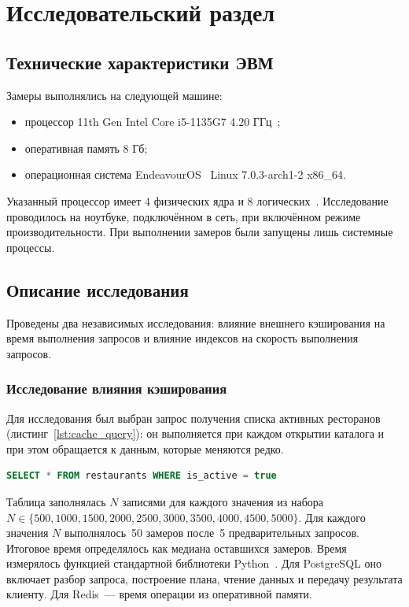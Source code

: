 \section{Исследовательский раздел}

\subsection{Технические характеристики ЭВМ}
Замеры выполнялись на следующей машине:
\begin{itemize}
    \item процессор 11th Gen Intel Core i5-1135G7 4.20 ГГц~\cite{processor};
    \item оперативная память 8 Гб;
    \item операционная система EndeavourOS~\cite{endeavouros} Linux 7.0.3-arch1-2 x86\_64.
\end{itemize}

Указанный процессор имеет 4 физических ядра и 8 логических~\cite{processor}.
Исследование проводилось на ноутбуке, подключённом в сеть, при включённом режиме производительности. При выполнении замеров были запущены лишь системные процессы.

\subsection{Описание исследования}
Проведены два независимых исследования: влияние внешнего кэширования
на время выполнения запросов и влияние индексов на скорость выполнения запросов.

\subsubsection{Исследование влияния кэширования}
Для исследования был выбран запрос получения списка активных ресторанов (листинг~\ref{lst:cache_query}): он выполняется при каждом открытии каталога и при этом обращается к данным, которые меняются редко.

\begin{lstlisting}[language=SQL, caption={Запрос для исследования кэширования}, label={lst:cache_query}]
SELECT * FROM restaurants WHERE is_active = true
\end{lstlisting}

Таблица заполнялась $N$ записями для каждого значения из набора $N \in \{500, 1000, 1500, 2000, 2500, 3000, 3500, 4000, 4500, 5000\}$. Для каждого значения $N$ выполнялось~50 замеров после~5 предварительных запросов. Итоговое время определялось как медиана оставшихся замеров. Время измерялось функцией  стандартной библиотеки Python~\cite{Python,time}. Для PostgreSQL оно включает разбор запроса, построение плана, чтение данных и передачу результата клиенту. Для Redis~--- время операции  из оперативной
памяти.

